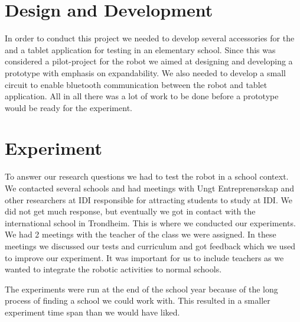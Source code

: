 \section{Design and Development}
In order to conduct this project we needed to develop several accessories for the \chirp and a tablet application for testing in an elementary school. 
Since this was considered a pilot-project for the \chirp robot we aimed at designing and developing a prototype with emphasis on expandability. 
We also needed to develop a small circuit to enable bluetooth communication between the robot and tablet application. 
All in all there was a lot of work to be done before a prototype would be ready for the experiment. 



\section{Experiment}
To answer our research questions we had to test the robot in a school context. We contacted several schools and had meetings with Ungt Entreprenørskap and other researchers at IDI responsible for attracting students to study at IDI. We did not get much response, but eventually we got in contact with the international school in Trondheim. This is where we conducted our experiments. We had 2 meetings with the teacher of the class we were assigned. In these meetings we discussed our tests and curriculum and got feedback which we used to improve our experiment. It was important for us to include teachers as we wanted to integrate the robotic activities to normal schools.

\bigskip\noindent
The experiments were run at the end of the school year because of the long process of finding a school we could work with. This resulted in a smaller experiment time span than we would have liked. 


